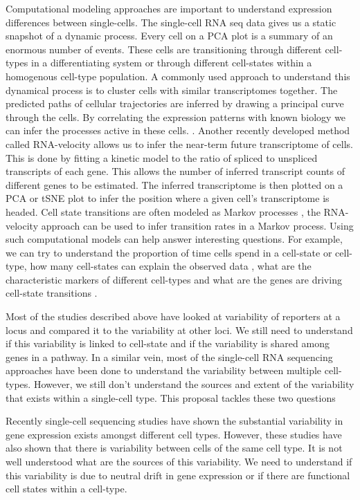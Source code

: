 Computational modeling approaches are important to understand expression differences between single-cells. The single-cell RNA seq data gives us a static snapshot of a dynamic process. Every cell on a PCA plot is a summary of an enormous number of events. These cells are transitioning through different cell-types in a differentiating system or through different cell-states within a homogenous cell-type population. A commonly used approach to understand this dynamical process is to cluster cells with similar transcriptomes together. The predicted paths of cellular trajectories are inferred by drawing a principal curve through the cells. By correlating the expression patterns with known biology we can infer the processes active in these cells. \cite{trapnell_dynamics_2014}. Another recently developed method called RNA-velocity allows us to infer the near-term future transcriptome of cells. This is done by fitting a kinetic model to the ratio of spliced to unspliced transcripts of each gene. This allows the number of inferred transcript counts of different genes to be estimated. The inferred transcriptome is then plotted on a PCA or tSNE plot to infer the position where a given cell's transcriptome is headed.  \cite{manno_rna_2018} Cell state transitions are often modeled as Markov processes \cite{stumpf_stem_2017}, the RNA-velocity approach can be used to infer transition rates in a Markov process. Using such computational models can help answer interesting questions. For example, we can try to understand the proportion of time cells spend in a cell-state or cell-type, how many cell-states can explain the observed data  \cite{chang_transcriptome-wide_2008}, what are the characteristic markers of different cell-types and what are the genes are driving cell-state transitions \cite{furchtgott_discovering_2017}.

Most of the studies described above have looked at variability of reporters at a locus and compared it to the variability at other loci. We still need to understand if this variability is linked to cell-state and if the variability is shared among genes in a pathway. In a similar vein, most of the single-cell RNA sequencing approaches have been done to understand the variability between multiple cell-types. However, we still don't understand the sources and extent of the variability that exists within a single-cell type. This proposal tackles these two questions

Recently single-cell sequencing studies have shown the substantial variability in gene expression exists amongst different cell types. However, these studies have also shown that there is variability between cells of the same cell type. It is not well understood what are the sources of this variability. We need to understand if this variability is due to neutral drift in gene expression or if there are functional cell states within a cell-type.

